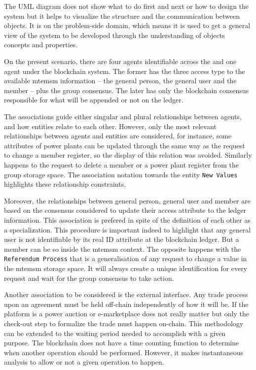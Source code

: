 The UML diagram does not show what to do first and next or how to design the system but it helps to visualize the structure and the communication between objects.
It is on the problem-side domain, which means it is used to get a general view of the system to be developed through the understanding of objects concepts and properties.

On the present scenario, there are four agents identifiable across the  and one agent under the blockchain system.
The former has the three access type to the available \gls{mtemsm} information -- the general person, the general user and the member -- plus the group consensus.
The later has only the blockchain consensus responsible for what will be appended or not on the ledger.

The associations guide either singular and plural relationships between agents, and how entities relate to each other.
However, only the most relevant relationships between agents and entities are considered, for instance, some attributes of power plants can be updated through the same way as the request to change a member register, so the display of this relation was avoided.
Similarly happens to the request to delete a member or a power plant register from the group storage space.
The association notation towards the entity \verb|New Values| highlights these relationship constraints.

Moreover, the relationships between general person, general user and member are based on the consensus considered to update their access attribute to the ledger information.
This association is prefered in spite of the definition of each other as a specialization.
This procedure is important indeed to highlight that any general user is not identifiable by its real ID attribute at the blockchain ledger. But a member can be so inside the \gls{mtemsm} context.
The opposite happens with the \verb|Referendum Process| that is a generalisation of any request to change a value in the \gls{mtemsm} storage space.
It will always create a unique identification for every request and wait for the group consensus to take action.

Another association to be considered is the external interface.
Any trade process upon an agreement must be held off-chain independently of how it will be.
If the platform is a power auction or e-marketplace does not really matter but only the check-out step to formalize the trade must happen on-chain.
This methodology can be extended to the waiting period needed to accomplish with a given purpose.
The blockchain does not have a time counting function to determine when another operation should be performed.
However, it makes instantaneous analysis to allow or not a given operation to happen.

